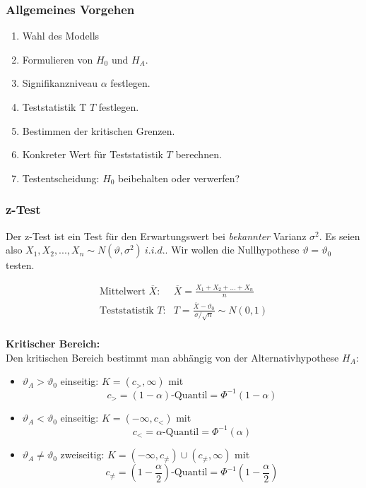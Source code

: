 \documentclass[10pt,a4paper,twocolumn]{article}
\begin{document}
\subsubsection{Allgemeines Vorgehen}
\begin{enumerate}
\item Wahl des Modells
\item Formulieren von $H_0$ und $H_A$.
\item Signifikanzniveau $\alpha$ festlegen.
\item Teststatistik T $T$ festlegen.
\item Bestimmen der kritischen Grenzen.
\item Konkreter Wert für Teststatistik $T$ berechnen.
\item Testentscheidung: $H_0$ beibehalten oder verwerfen?
\end{enumerate}

\subsubsection{z-Test}
Der z-Test ist ein Test für den Erwartungswert bei \emph{bekannter} Varianz $\sigma^2$. Es seien also $X_1,X_2,...,X_n \sim N(\vartheta,\sigma^2)\ i.i.d.$. Wir wollen die Nullhypothese $\vartheta=\vartheta_0$ testen.

\[
\begin{array}{ll}
	\text{Mittelwert $\overline{X}$:} & \overline{X}=\frac{X_1+X_2+...+X_n}{n} \\
	\text{Teststatistik $T$:} & T = \frac{\overline{X}-\vartheta_0}{\sigma/\sqrt{n}}\sim N(0,1) \\
\end{array}
\]

\textbf{Kritischer Bereich:} \\
Den kritischen Bereich bestimmt man abhängig von der Alternativhypothese $H_A$:
\begin{itemize}
\item $\vartheta_A > \vartheta_0$ einseitig: $K = (c_>,\infty)$ mit
\[
c_> = (1 - \alpha)\text{-Quantil} = \Phi^{-1}(1 - \alpha)
\]
\item $\vartheta_A < \vartheta_0$ einseitig: $K = (-\infty,c_<)$ mit
\[
c_< = \alpha\text{-Quantil} = \Phi^{-1}(\alpha)
\]
\item $\vartheta_A \neq \vartheta_0$ zweiseitig: $K = (-\infty,c_{\neq}) \cup (c_{\neq},\infty)$ mit
\[
c_{\neq} = \left(1-\frac{\alpha}{2}\right)\text{-Quantil} = \Phi^{-1}\left(1-\frac{\alpha}{2}\right)
\]
\end{itemize}
\end{document}
